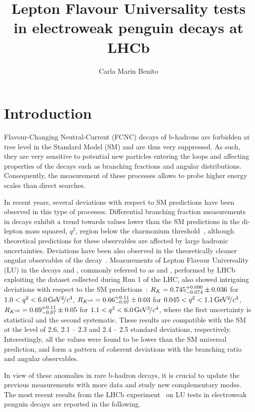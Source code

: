 \documentclass[a4paper,11pt]{article}
\title{Lepton Flavour Universality tests in electroweak penguin decays at LHCb}
\author*[a,1]{Carla Marin Benito}
\affiliation[a]{Universit\'e Paris-Saclay, CNRS/IN2P3, IJCLab,\\
   91405 Orsay, France }
\begin{document}
\maketitle


\section{Introduction}
Flavour-Changing Neutral-Current (FCNC) decays of b-hadrons are forbidden 
at tree level in the Standard Model (SM) and are thus very suppressed.  As such, they are 
very sensitive to potential new particles entering the loops and affecting properties of the decays 
such as branching fractions and angular distributions. Consequently, the measurement of these processes allows to probe higher energy scales than direct searches. 

In recent years, several deviations with respect to SM predictions have been observed in this type of processes. 
Differential branching fraction measurements in \btosmm decays exhibit a trend towards values lower than the SM predictions in the di-lepton mass squared, $q^2$, 
region below the charmonium threshold~\cite{anomalies},
although theoretical predictions for these observables are affected by large hadronic uncertainties. 
Deviations have been also observed in the theoretically cleaner angular observables of the 
\BdToKstmm decay~\cite{LHCb-PAPER-2020-002}. 
Measurements of Lepton Flavour Universality (LU) in the decays \BuToKll and \BdToKstll, commonly referred to as \RK and \RKst, performed by LHCb exploiting the dataset collected during Run 1 of the LHC, also showed intriguing deviations with respect to the SM predictions~\cite{LUR1}: 
$R_K = 0.745^{+0.090}_{-0.074} \pm 0.036$  for $1.0<q^2<6.0 {\mathrm{\,Ge\kern -0.1em V^2\!/}c^4}$,
$R_{{{K}}^{*0}} = 0.66^{+0.11}_{-0.07} \pm 0.03 $ for $0.045<q^2<1.1 {\mathrm{\,Ge\kern -0.1em V^2\!/}c^4}$,
$R_{{{K}}^{*0}} = 0.69^{+0.11}_{-0.07} \pm 0.05 $ for $1.1<q^2<6.0 {\mathrm{\,Ge\kern -0.1em V^2\!/}c^4}$,
where the first uncertainty is statistical and the second systematic. 
These results are compatible with the SM at the level of 2.6, 2.1 -- 2.3 and 2.4 -- 2.5 standard deviations, respectively. 
Interestingly, all the values were found to be lower than the SM universal prediction, 
and form a pattern of coherent deviations with the branching ratio and angular observables. 

In view of these anomalies in rare b-hadron decays, it is crucial to update the previous measurements with more data
and study new complementary modes. 
The most recent results from the LHCb experiment~\cite{LHCb-DP-2008-001} on LU tests in electroweak penguin decays 
are reported in the following.
\end{document}
